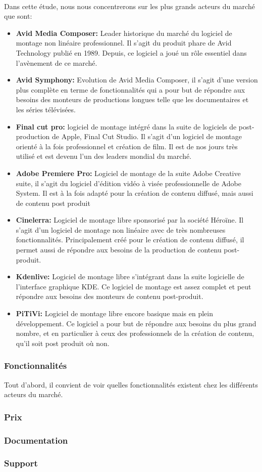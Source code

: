 \paragraph{}
  Dans cette étude, nous nous concentrerons sur les plus grands acteurs du marché que sont:
  \begin{itemize}
    \item{\textbf{Avid Media Composer:} Leader historique du marché du logiciel de montage non linéaire
      professionnel. Il s'agit du produit phare de Avid Technology publié en 1989. Depuis, ce
      logiciel a joué un rôle essentiel dans l'avènement de ce marché.}
    \item{\textbf{Avid Symphony:} Evolution de Avid Media Composer, il s'agit d'une version plus complète en terme
      de fonctionnalités qui a pour but de répondre aux besoins des monteurs de productions longues telle que
      les documentaires et les séries télévisées.}
    \item{\textbf{Final cut pro:} logiciel de montage intégré dans la suite de logiciels de post-production
          de Apple, Final Cut Studio. Il s'agit d'un logiciel de montage orienté à la fois
          professionnel et création de film. Il est de nos jours très utilisé et est devenu l'un
          des leaders mondial du marché.}
    \item{\textbf{Adobe Premiere Pro:} Logiciel de montage de la suite Adobe Creative suite, il s'agit du logiciel
      d'édition vidéo à visée professionnelle de Adobe System. Il est à la fois adapté pour la création
      de contenu diffusé, mais aussi de contenu post produit}
    \item{\textbf{Cinelerra:} Logiciel de montage libre sponsorisé par la société Héroïne. Il s'agit d'un logiciel
      de montage non linéaire avec de très nombreuses fonctionnalités. Principalement créé pour le création de contenu
      diffusé, il permet aussi de répondre aux besoins de la production de contenu post-produit.}
    \item{\textbf{Kdenlive:} Logiciel de montage libre s'intégrant dans la suite logicielle de l'interface graphique KDE.
      Ce logiciel de montage est assez complet et peut répondre aux besoins des monteurs de contenu post-produit.}
    \item{\textbf{PiTiVi:} Logiciel de montage libre encore basique mais en plein développement. Ce logiciel a pour
      but de répondre aux besoins du plus grand nombre, et en particulier à ceux des professionnels de la création de
      contenu, qu'il soit post produit où non.}
  \end{itemize}

\subsubsection{Fonctionnalités}
  Tout d'abord, il convient de voir quelles fonctionnalités existent chez les différents
  acteurs du marché.
  \subsubsection{Prix}
  \subsubsection{Documentation}
  \subsubsection{Support}
